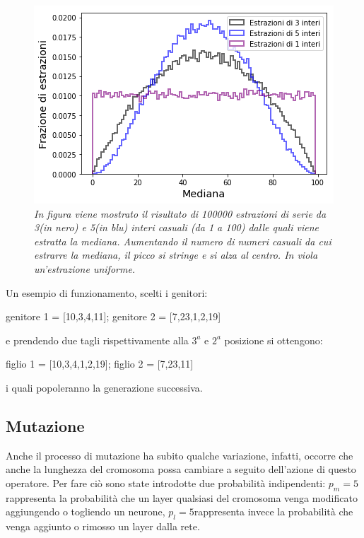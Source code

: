 \documentclass[12pt,a4paper]{report}
\begin{document}
\begin{figure}[H]
 \centering
 \includegraphics[scale = 0.7]{images/median-3-5}
 \caption{\textit{In figura viene mostrato il risultato di 100000 estrazioni di serie da 3(in nero) e 5(in blu) interi casuali (da 1 a 100) dalle quali viene estratta la mediana. Aumentando il numero di numeri casuali da cui estrarre la mediana, il picco si stringe e si alza al centro. In viola un'estrazione uniforme.}}
 \label{median}
\end{figure}

Un esempio di funzionamento, scelti i genitori:

\begin{center}
 genitore 1 = [10,3,4,11];  genitore 2 = [7,23,1,2,19]\\
\end{center}

e prendendo due tagli rispettivamente alla $3^{a}$ e $2^{a}$ posizione si ottengono:

\begin{center}
 figlio 1 = [10,3,4,1,2,19]; figlio 2 = [7,23,11]
\end{center}

i quali popoleranno la generazione successiva.

\subsection{Mutazione}

Anche il processo di mutazione ha subito qualche variazione, infatti, occorre che anche la lunghezza del cromosoma possa cambiare a seguito dell'azione di questo operatore.
Per fare ciò sono state introdotte due probabilità indipendenti: $p_{m} = 5$\textdiscount \text{ }rappresenta la probabilità che un layer qualsiasi del cromosoma venga modificato aggiungendo o togliendo un neurone, $p_{l} = 5$\textdiscount \text{ }rappresenta invece la probabilità che venga aggiunto o rimosso un layer dalla rete.
\end{document}
